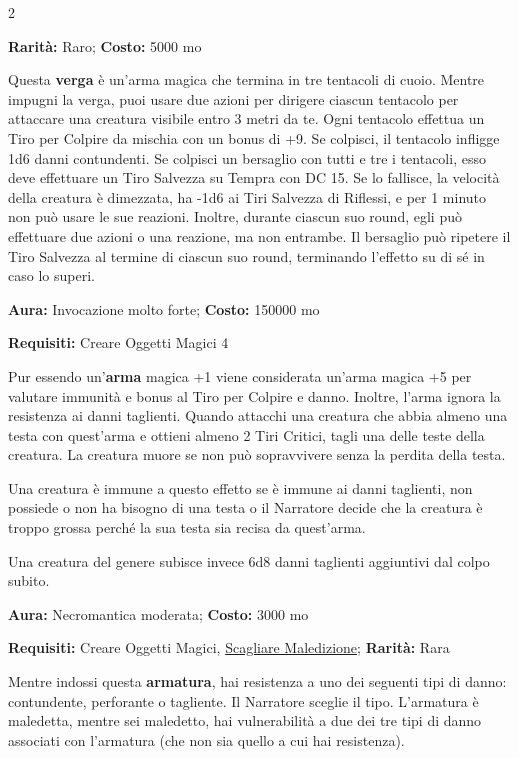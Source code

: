 \begin{multicols}{2}

\textbf{Rarità:} Raro; \textbf{Costo:} 5000 mo

Questa \textbf{verga} è un'arma magica che termina in tre tentacoli di cuoio. Mentre impugni la verga, puoi usare due azioni per dirigere ciascun tentacolo per attaccare una creatura visibile entro 3 metri da te. Ogni tentacolo effettua un Tiro per Colpire da mischia con un bonus di +9. Se colpisci, il tentacolo infligge 1d6 danni contundenti. Se colpisci un bersaglio con tutti e tre i tentacoli, esso deve effettuare un Tiro Salvezza su Tempra con DC 15. Se lo fallisce, la velocità della creatura è dimezzata, ha -1d6 ai Tiri Salvezza di Riflessi, e per 1 minuto non può usare le sue reazioni. Inoltre, durante ciascun suo round, egli può effettuare due azioni o una reazione, ma non entrambe. Il bersaglio può ripetere il Tiro Salvezza al termine di ciascun suo round, terminando l'effetto su di sé in caso lo superi.


\textbf{Aura:} Invocazione molto forte; \textbf{Costo:} 150000 mo

\textbf{Requisiti:} Creare Oggetti Magici 4

Pur essendo un'\textbf{arma} magica +1 viene considerata un'arma magica +5 per valutare immunità e bonus al Tiro per Colpire e danno. Inoltre, l'arma ignora la resistenza ai danni taglienti. Quando attacchi una creatura che abbia almeno una testa con quest'arma e ottieni almeno 2 Tiri Critici, tagli una delle teste della creatura. La creatura muore se non può sopravvivere senza la perdita della testa.

Una creatura è immune a questo effetto se è immune ai danni taglienti, non possiede o non ha bisogno di una testa o il Narratore decide che la creatura è troppo grossa perché la sua testa sia recisa da quest'arma.

Una creatura del genere subisce invece 6d8 danni taglienti aggiuntivi dal colpo subito.


\textbf{Aura:} Necromantica moderata; \textbf{Costo:} 3000 mo

\textbf{Requisiti:} Creare Oggetti Magici, \hyperlink{Scagliare Maledizione}{Scagliare Maledizione}; \textbf{Rarità:} Rara

Mentre indossi questa \textbf{armatura}, hai resistenza a uno dei seguenti tipi di danno: contundente, perforante o tagliente. Il Narratore sceglie il tipo. L'armatura è maledetta, mentre sei maledetto, hai vulnerabilità a due dei tre tipi di danno associati con l'armatura (che non sia quello a cui hai resistenza).


\end{multicols}
